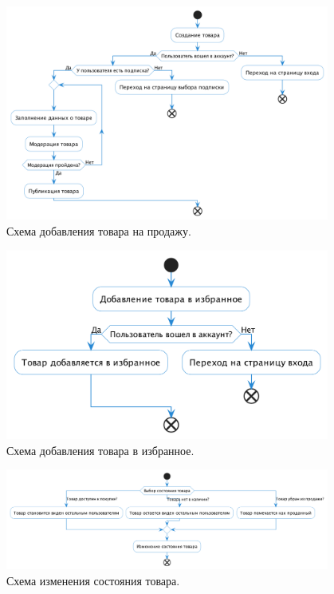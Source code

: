 \documentclass[a4paper,14pt]{extarticle}
\begin{document}
\begin{figure}[H]
    \centering
    \includegraphics[width=0.95\textwidth]{images/add_item.png}
    \caption{Схема добавления товара на продажу.}
\end{figure}

\begin{figure}[H]
    \centering
    \includegraphics[width=0.95\textwidth]{images/add_to_favourites.png}
    \caption{Схема добавления товара в избранное.}
\end{figure}

\begin{figure}[H]
    \centering
    \includegraphics[width=0.95\textwidth]{images/change_item.png}
    \caption{Схема изменения состояния товара.}
\end{figure}
\end{document}
